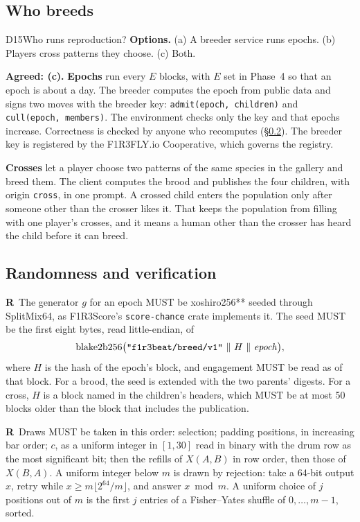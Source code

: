 \documentclass[11pt,a4paper]{article}
\newcommand{\code}[1]{\texttt{#1}}
\newcommand{\MUST}{\textsc{must}}
\newcounter{req}
\newcommand{\req}[1]{\refstepcounter{req}\label{#1}\textbf{R\thereq}}
\renewcommand{\MUST}{{\fontsize{0.82em}{1em}\selectfont MUST}}
\begin{document}
\subsection{Who breeds}

\begin{decision}{D15}{Who runs reproduction?}
\textbf{Options.} (a) A breeder service runs epochs. (b) Players cross patterns they choose.
(c) Both.

\textbf{Agreed: (c).} \textbf{Epochs} run every $E$ blocks, with $E$ set in Phase~4 so
that an epoch is about a day. The breeder computes the epoch from public data and signs two
moves with the breeder key: \code{admit(epoch, children)} and \code{cull(epoch, members)}. The
environment checks only the key and that epochs increase. Correctness is checked by anyone who
recomputes (\S\ref{sec:verify}). The breeder key is registered by the F1R3FLY.io Cooperative,
which governs the registry.

\textbf{Crosses} let a player choose two patterns of the same species in the gallery and breed
them. The client computes the brood and publishes the four children, with origin \code{cross},
in one prompt. A crossed child enters the population only after someone other than the crosser
likes it. That keeps the population from filling with one player's crosses, and it means a
human other than the crosser has heard the child before it can breed.
\end{decision}

\subsection{Randomness and verification}\label{sec:verify}

\req{r:seed}~The generator $g$ for an epoch \MUST{} be xoshiro256** seeded through SplitMix64,
as F1R3Score's \code{score-chance} crate implements it. The seed \MUST{} be the first eight bytes,
read little-endian, of
\[
  \mathrm{blake2b256}\bigl(\text{\code{"f1r3beat/breed/v1"}}\ \|\ H\ \|\ \mathit{epoch}\bigr),
\]
where $H$ is the hash of the epoch's block, and engagement \MUST{} be read as of that block.
For a brood, the seed is extended with the two parents' digests. For a cross, $H$ is a block
named in the children's headers, which \MUST{} be at most 50 blocks older than the block that
includes the publication.

\req{r:draws}~Draws \MUST{} be taken in this order: selection; padding positions, in
increasing bar order; $c$, as a uniform integer in $[1,30]$ read in binary with the drum row as
the most significant bit; then the refills of $X(A,B)$ in row order, then those of $X(B,A)$. A
uniform integer below $m$ is drawn by rejection: take a 64-bit output $x$, retry while
$x\ge m\lfloor 2^{64}/m\rfloor$, and answer $x\bmod m$. A uniform choice of $j$ positions out of
$m$ is the first $j$ entries of a Fisher--Yates shuffle of $0,\dots,m-1$, sorted.
\end{document}
